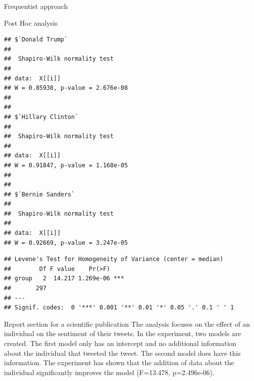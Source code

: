 \documentclass[
  ignorenonframetext,
]{beamer}
\newenvironment{Shaded}{\begin{snugshade}}{\end{snugshade}}
\newcommand{\FunctionTok}[1]{\textcolor[rgb]{0.00,0.00,0.00}{#1}}
\newcommand{\NormalTok}[1]{#1}
\newcommand{\SpecialCharTok}[1]{\textcolor[rgb]{0.00,0.00,0.00}{#1}}
\begin{document}
\begin{frame}[fragile]{Frequentist approach}
\begin{block}{Post Hoc analysis}
\begin{Shaded}
\end{Shaded}

\begin{verbatim}
## $`Donald Trump`
## 
##  Shapiro-Wilk normality test
## 
## data:  X[[i]]
## W = 0.85938, p-value = 2.676e-08
## 
## 
## $`Hillary Clinton`
## 
##  Shapiro-Wilk normality test
## 
## data:  X[[i]]
## W = 0.91847, p-value = 1.168e-05
## 
## 
## $`Bernie Sanders`
## 
##  Shapiro-Wilk normality test
## 
## data:  X[[i]]
## W = 0.92669, p-value = 3.247e-05
\end{verbatim}

\begin{Shaded}
\end{Shaded}

\begin{verbatim}
## Levene's Test for Homogeneity of Variance (center = median)
##        Df F value    Pr(>F)    
## group   2  14.217 1.269e-06 ***
##       297                      
## ---
## Signif. codes:  0 '***' 0.001 '**' 0.01 '*' 0.05 '.' 0.1 ' ' 1
\end{verbatim}
\end{block}

\begin{block}{Report section for a scientific publication}
\protect\hypertarget{report-section-for-a-scientific-publication}{}
The analysis focuses on the effect of an individual on the sentiment of
their tweets. In the experiment, two models are created. The first model
only has an intercept and no additional information about the individual
that tweeted the tweet. The second model does have this information. The
experiment has shown that the addition of data about the individual
significantly improves the model (F=13.478, p=2.496e-06).


\end{block}
\end{frame}
\end{document}
